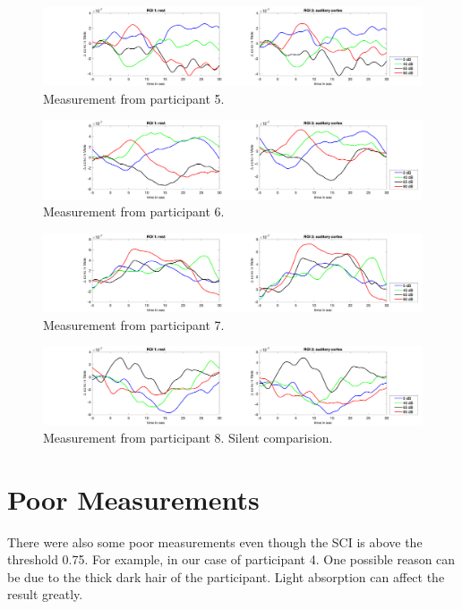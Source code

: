 \begin{figure}[H]
  \centering
    \includegraphics[scale=.29]{bilder/ROI/sub_lukas_s_HbO.png}
  \caption{Measurement from participant 5.}
  \label{fig:somesignal}
\end{figure}

\begin{figure}[H]
  \centering
    \includegraphics[scale=.29]{bilder/ROI/sub_shelia_s_HbO.png}
  \caption{Measurement from participant  6.}
  \label{fig:somesignal}
\end{figure}


\begin{figure}[H]
  \centering
    \includegraphics[scale=.29]{bilder/ROI/sub_liao_s_HbO.png}
  \caption{Measurement from participant 7.}
  \label{fig:somesignal}
\end{figure}



\begin{figure}[H]
  \centering
    \includegraphics[scale=.29]{bilder/ROI/sub_luca2_s_HbO.png}
  \caption{Measurement from participant 8. Silent comparision.}
  \label{fig:somesignal}
\end{figure}

\newpage

\section {Poor Measurements}
There were also some poor measurements even though the SCI is above the threshold 0.75. For example, in our case of participant 4. One possible reason can be due to the thick dark hair of the participant. Light absorption can affect the result greatly.

